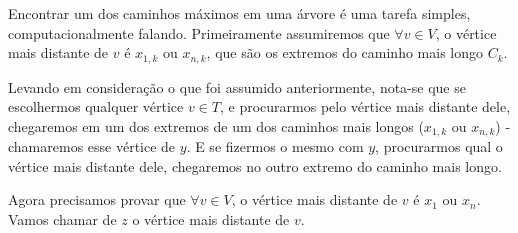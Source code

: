 \documentclass[a4paper,12pt]{article}
\begin{document}
        Encontrar um dos caminhos máximos em uma árvore é uma 
        tarefa simples, computacionalmente falando. Primeiramente
        assumiremos que $\forall v \in V$, o vértice mais distante
        de $v$ é $x_{1, k}$ ou $x_{n, k}$, que são os extremos do
        caminho mais longo $C_k$.

        Levando em consideração o que foi assumido anteriormente,
        nota-se que se escolhermos 
        qualquer vértice $v \in T$, e procurarmos pelo vértice mais
        distante dele, chegaremos em um dos extremos de um dos 
        caminhos mais longos ($x_{1, k}$ 
        ou $x_{n, k}$) - chamaremos esse vértice de $y$.
        E se fizermos o mesmo com $y$, procurarmos qual o vértice 
        mais distante dele, chegaremos no
        outro extremo do caminho mais longo.
        

        Agora precisamos provar que $\forall v \in V$, o vértice 
        mais distante
        de $v$ é $x_1$ ou $x_n$.
        Vamos chamar de $z$ o vértice mais distante de $v$.
        
\end{document}
